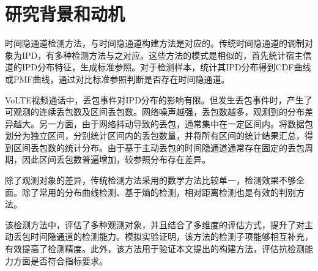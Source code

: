 \section{研究背景和动机}
\label{chap:analyze:motivation}

时间隐通道检测方法，与时间隐通道构建方法是对应的。传统时间隐通道的调制对象为IPD，有多种检测方法与之对应。这些方法的模式是相似的，首先统计宿主信道的IPD分布特征，生成标准参照。对于检测样本，统计其IPD分布得到CDF曲线或PMF曲线，通过对比标准参照判断是否存在时间隐通道。

VoLTE视频通话中，丢包事件对IPD分布的影响有限。但发生丢包事件时，产生了可观测的连续丢包数及区间丢包数。网络噪声越强，丢包数越多，观测到的分布差异越大。另一方面，由于网络抖动导致的丢包，通常集中在一定区间内。将数据包划分为独立区间，分别统计区间内的丢包数量，并将所有区间的统计结果汇总，得到区间丢包数的统计分布。由于基于主动丢包的时间隐通道通常存在固定的丢包周期，因此区间丢包数普遍增加，较参照分布存在差异。

除了观测对象的差异，传统检测方法采用的数学方法比较单一，检测效果不够全面。除了常用的分布曲线检测、基于熵的检测，相对距离检测也是有效的判别方法。

该检测方法中，评估了多种观测对象，并且结合了多维度的评估方式，提升了对主动丢包时间隐通道的检测能力。模拟实验证明，该方法的检测子项能够相互补充，有效提高了检测精度。此外，该方法用于验证本文提出的构建方法，评估抗检测能力方面是否符合指标要求。
